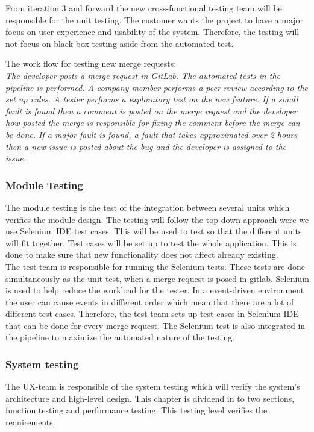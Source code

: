 \noindent From iteration 3 and forward the new cross-functional testing team will be responsible for the unit testing. The customer wants the project to have a major focus on user experience and usability of the system. Therefore, the testing will not focus on black box testing aside from the automated test. \newline

\noindent The work flow for testing new merge requests:\\
 \emph{The developer posts a merge request in GitLab. The automated tests in the pipeline is performed. A company member performs a peer review according to the set up rules. A tester performs a exploratory test on the new feature. If a small fault is found then a comment is posted on the merge request and the developer how posted the merge is responsible for fixing the comment before the merge can be done. If a major fault is found, a fault that takes approximated over 2 hours then a new issue is posted about the bug and the developer is assigned to the issue.} \newline

\subsubsection{Module Testing}
The module testing is the test of the integration between several units which verifies the module design. The testing will follow the top-down approach were we use Selenium IDE test cases. This will be used to test so that the different units will fit together. Test cases will be set up to test the whole application. This is done to make sure that new functionality does not affect already existing.\\

\noindent The test team is responsible for running the Selenium tests. These tests are done simultaneously as the unit test, when a merge request is posed in gitlab. Selenium is used to help reduce the workload for the tester. In a event-driven environment the user can cause events in different order which mean that there are a lot of different test cases. Therefore, the test team sets up test cases in Selenium IDE that can be done for every merge request. The Selenium test is also integrated in the pipeline to maximize the automated nature of the testing. 

\subsubsection{System testing}
The UX-team is responsible of the system testing which will verify the system's architecture and high-level design. This chapter is dividend in to two sections, function testing and performance testing. This testing level verifies the requirements. \newline

